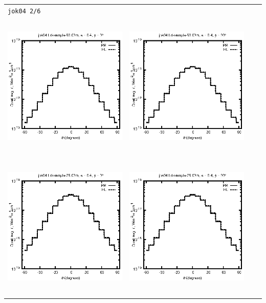 \begin{tabular}{c c c c}
\multicolumn{4}{l}{\texttt{jok04 2/6}} \\
\includegraphics[height=7cm]{../eps/jok04_Ld_sample_50.00m_fwd.eps} &
\includegraphics[height=7cm]{../eps/jok04_Ld_sample_50.00m_cross.eps} \\
\includegraphics[height=7cm]{../eps/jok04_Ld_sample_75.00m_fwd.eps} &
\includegraphics[height=7cm]{../eps/jok04_Ld_sample_75.00m_cross.eps} \\

\end{tabular}
